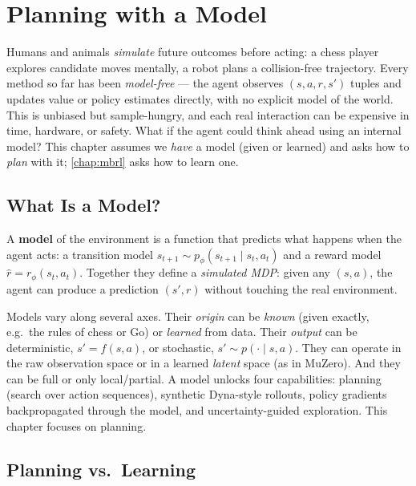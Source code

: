 \documentclass[11pt, oneside]{book}
\begin{document}
\chapter{Planning with a Model}
\label{chap:planning}

Humans and animals \emph{simulate} future outcomes before acting: a chess player explores
candidate moves mentally, a robot plans a collision-free trajectory. Every method so far
has been \emph{model-free} --- the agent observes $(s,a,r,s')$ tuples and updates value or
policy estimates directly, with no explicit model of the world. This is unbiased but
sample-hungry, and each real interaction can be expensive in time, hardware, or safety.
What if the agent could think ahead using an internal model? This chapter assumes we
\emph{have} a model (given or learned) and asks how to \emph{plan} with it;
\cref{chap:mbrl} asks how to learn one.

\section{What Is a Model?}

A \textbf{model} of the environment is a function that predicts what happens when the
agent acts: a transition model $s_{t+1} \sim p_\phi(s_{t+1}\mid s_t, a_t)$ and a reward
model $\hat r = r_\phi(s_t, a_t)$. Together they define a \emph{simulated MDP}: given any
$(s,a)$, the agent can produce a prediction $(s', r)$ without touching the real
environment.

Models vary along several axes. Their \emph{origin} can be \emph{known} (given exactly,
e.g.\ the rules of chess or Go) or \emph{learned} from data. Their \emph{output} can be
deterministic, $s' = f(s,a)$, or stochastic, $s' \sim p(\cdot\mid s,a)$. They can operate
in the raw observation space or in a learned \emph{latent} space (as in MuZero). And they
can be full or only local/partial. A model unlocks four capabilities: planning (search
over action sequences), synthetic Dyna-style rollouts, policy gradients backpropagated
through the model, and uncertainty-guided exploration. This chapter focuses on planning.

\section{Planning vs.\ Learning}
\end{document}
